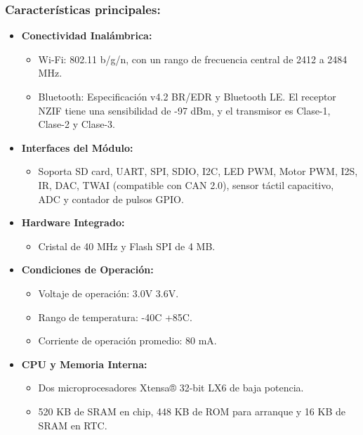 \documentclass[a4paper,12pt]{article}
\begin{document}
	\subsubsection{Características principales:}
	\begin{itemize}
		\item \textbf{Conectividad Inalámbrica:}
		\begin{itemize}
			\item Wi-Fi: 802.11 b/g/n, con un rango de frecuencia central de 2412 a 2484 MHz.
			
			\item Bluetooth: Especificación v4.2 BR/EDR y Bluetooth LE. El receptor NZIF tiene una sensibilidad de -97 dBm, y el transmisor es Clase-1, Clase-2 y Clase-3.
		\end{itemize}
		
		\item \textbf{Interfaces del Módulo:}
		\begin{itemize}
			\item Soporta SD card, UART, SPI, SDIO, I2C, LED PWM, Motor PWM, I2S, IR, DAC, TWAI (compatible con CAN 2.0), sensor táctil capacitivo, ADC y contador de pulsos GPIO.
		\end{itemize}
		
		\item \textbf{Hardware Integrado:}
		\begin{itemize}
			\item Cristal de 40 MHz y Flash SPI de 4 MB.
		\end{itemize}
		
		\item \textbf{Condiciones de Operación:}
		\begin{itemize}
			\item Voltaje de operación: 3.0V 3.6V.
			\item Rango de temperatura: -40C +85C.
			\item Corriente de operación promedio: 80 mA.
		\end{itemize}
		\item \textbf{CPU y Memoria Interna:}
		\begin{itemize}
			\item Dos microprocesadores Xtensa® 32-bit LX6 de baja potencia.
			
			\item 520 KB de SRAM en chip, 448 KB de ROM para arranque y 16 KB de SRAM en RTC.
			
			
		\end{itemize}
	\end{itemize}
	
\end{document}
